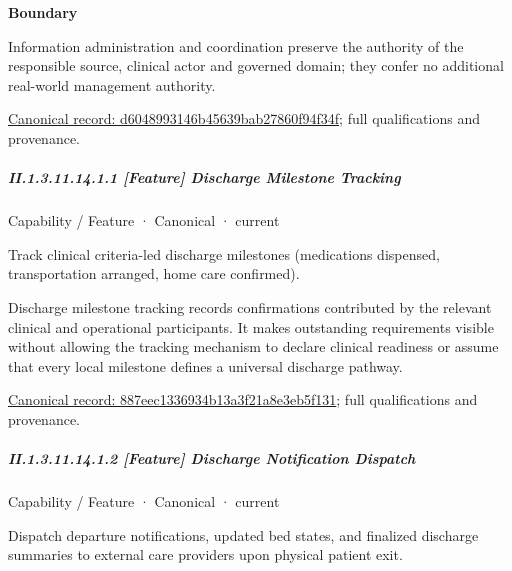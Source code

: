 \textbf{Boundary}



Information administration and coordination preserve the authority of the responsible source, clinical actor and governed domain; they confer no additional real-world management authority.


{\footnotesize \href{../../../../continuum/strategy/capability/d6048993146b45639bab27860f94f34f.md}{Canonical record: d6048993146b45639bab27860f94f34f}; full qualifications and provenance.}\par
\subparagraph*{II.1.3.11.14.1.1 [Feature] Discharge Milestone Tracking}
\label{navigation:II.1.3.11.14.1.1}

\label{element:887eec1336934b13a3f21a8e3eb5f131}
{\small Capability / Feature · Canonical · current}\par

Track clinical criteria-led discharge milestones (medications dispensed, transportation arranged, home care confirmed).



Discharge milestone tracking records confirmations contributed by the relevant clinical and operational participants. It makes outstanding requirements visible without allowing the tracking mechanism to declare clinical readiness or assume that every local milestone defines a universal discharge pathway.


{\footnotesize \href{../../../../continuum/strategy/capability/feature/887eec1336934b13a3f21a8e3eb5f131.md}{Canonical record: 887eec1336934b13a3f21a8e3eb5f131}; full qualifications and provenance.}\par
\subparagraph*{II.1.3.11.14.1.2 [Feature] Discharge Notification Dispatch}
\label{navigation:II.1.3.11.14.1.2}

\label{element:5476307ca5a34590aa7025ab59ca0c10}
{\small Capability / Feature · Canonical · current}\par

Dispatch departure notifications, updated bed states, and finalized discharge summaries to external care providers upon physical patient exit.



